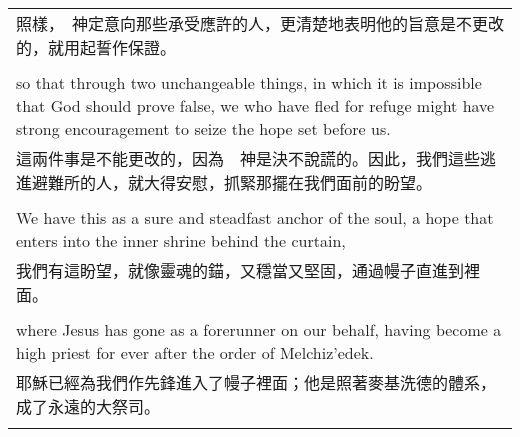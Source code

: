 \begin{tabularx}{\textwidth}{p{}}
照樣，　神定意向那些承受應許的人，更清楚地表明他的旨意是不更改的，就用起誓作保證。 \\ \\
so that through two unchangeable things, in which it is impossible that God should prove false, we who have fled for refuge might have strong encouragement to seize the hope set before us. \\
這兩件事是不能更改的，因為　神是決不說謊的。因此，我們這些逃進避難所的人，就大得安慰，抓緊那擺在我們面前的盼望。 \\ \\
We have this as a sure and steadfast anchor of the soul, a hope that enters into the inner shrine behind the curtain, \\
我們有這盼望，就像靈魂的錨，又穩當又堅固，通過幔子直進到裡面。 \\ \\
where Jesus has gone as a forerunner on our behalf, having become a high priest for ever after the order of Melchiz'edek. \\
耶穌已經為我們作先鋒進入了幔子裡面；他是照著麥基洗德的體系，成了永遠的大祭司。 \\ \\

\hline
\end{tabularx}

\newpage

